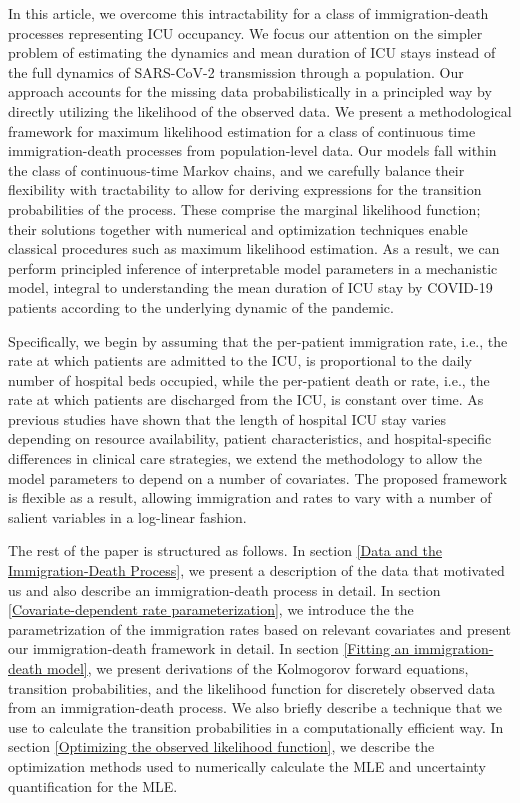 \documentclass{article}
\newcommand{\achal}[1]{{\color{black}{ #1}}}
\begin{document}
In this article, we overcome this intractability for a class of immigration-death processes representing ICU occupancy. We focus our attention on the simpler problem of estimating the dynamics and mean duration of ICU stays instead of the full dynamics of SARS-CoV-2 transmission through a population. Our approach accounts for the missing data probabilistically in a principled way by directly utilizing the likelihood of the observed data. We present a methodological framework for maximum likelihood estimation for a class of continuous time immigration-death processes from population-level data. Our models fall within the class of continuous-time Markov chains, and we carefully balance their flexibility with tractability to allow for deriving expressions for the transition probabilities of the process. These comprise the marginal likelihood function; their solutions together with numerical and optimization techniques enable classical procedures such as maximum likelihood estimation. As a result, we can perform principled inference of interpretable model parameters in a mechanistic model, integral to understanding the mean duration of ICU stay by COVID-19 patients according to the underlying dynamic of the pandemic.\par

Specifically, we begin by assuming that the per-patient immigration rate, i.e., the rate at which patients are admitted to the ICU, is proportional to the daily number of hospital beds occupied, while the per-patient death or \achal{clearance} rate, i.e., the rate at which patients are discharged from the ICU, is constant over time. As previous studies have shown that the length of hospital ICU stay varies depending on resource availability, patient characteristics, and hospital-specific differences in clinical care strategies,\cite{lescure2021sarilumab} we extend the methodology to allow the model parameters to depend on a number of covariates. The proposed framework is flexible as a result, allowing immigration and\achal{clearance} rates to vary with a number of salient variables in a log-linear fashion. \par

The rest of the paper is structured as follows. In section \ref{Data and the Immigration-Death Process}, we present a description of the data that motivated us and also describe an immigration-death process in detail. In section \ref{Covariate-dependent rate parameterization}, we introduce the the parametrization of the immigration rates based on relevant covariates and present our immigration-death framework in detail. In section \ref{Fitting an immigration-death model}, we present derivations of the Kolmogorov forward equations, transition probabilities, and the likelihood function for discretely observed data from an immigration-death process. We also briefly describe a technique that we use to calculate the transition probabilities in a computationally efficient way. In section \ref{Optimizing the observed likelihood function}, we describe the optimization methods used to numerically calculate the MLE and uncertainty quantification for the MLE. \par
\end{document}

